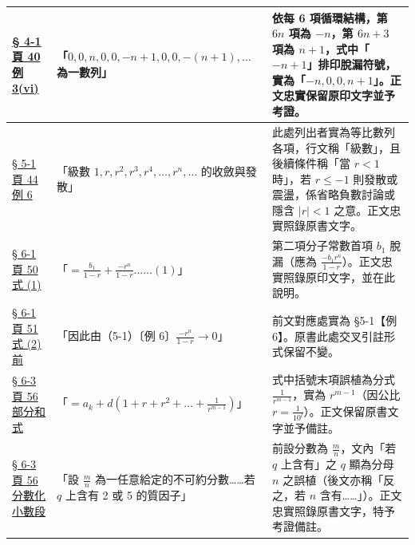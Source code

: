 \documentclass[a4paper,12pt,twoside]{article}
\begin{document}
\begin{table}[H]
\begin{tabularx}{\textwidth}{|p{3.0cm}|p{3.8cm}|X|}
\hyperref[note:b2-ch2-p40-ex3-vi]{§ 4-1 頁 40 例 3(vi)} & 
「$0, 0, n, 0, 0, -n+1, 0, 0, -(n+1), \dots$ 為一數列」 & 
依每 6 項循環結構，第 $6n$ 項為 $-n$，第 $6n+3$ 項為 $n+1$，式中「$-n+1$」排印脫漏符號，實為「$-n, 0, 0, n+1$」。正文忠實保留原印文字並予考證。 \\ \hline

\hyperref[note:b2-ch2-p44-ex6-series-term]{§ 5-1 頁 44 例 6} & 
「級數 $1, r, r^2, r^3, r^4, \dots, r^n, \dots$ 的收斂與發散」 & 
此處列出者實為等比數列各項，行文稱「級數」，且後續條件稱「當 $r<1$ 時」，若 $r\le -1$ 則發散或震盪，係省略負數討論或隱含 $|r|<1$ 之意。正文忠實照錄原書文字。 \\ \hline

\hyperref[note:b2-ch2-p50-eq1-b1]{§ 6-1 頁 50 式 (1)} & 
「$= \frac{b_1}{1-r} + \frac{-r^n}{1-r} \dots\dots(1)$」 & 
第二項分子常數首項 $b_1$ 脫漏（應為 $\frac{-b_1 r^n}{1-r}$）。正文忠實照錄原印文字，並在此說明。 \\ \hline

\hyperref[note:b2-ch2-p51-lim-rn]{§ 6-1 頁 51 式 (2) 前} & 
「因此由（5-1）〔例 6〕$\frac{-r^n}{1-r} \to 0$」 & 
前文對應處實為 §5-1【例 6】。原書此處交叉引註形式保留不變。 \\ \hline

\hyperref[note:b2-ch2-p56-partial-sum-r]{§ 6-3 頁 56 部分和式} & 
「$= a_k + d(1+r+r^2+\dots+\frac{1}{r^{m-1}})$」 & 
式中括號末項誤植為分式 $\frac{1}{r^{m-1}}$，實為 $r^{m-1}$（因公比 $r=\frac{1}{10^l}$）。正文保留原書文字並予備註。 \\ \hline

\hyperref[note:b2-ch2-p56-q-typo]{§ 6-3 頁 56 分數化小數段} & 
「設 $\frac{m}{n}$ 為一任意給定的不可約分數……若 $q$ 上含有 2 或 5 的質因子」 & 
前設分數為 $\frac{m}{n}$，文內「若 $q$ 上含有」之 $q$ 顯為分母 $n$ 之誤植（後文亦稱「反之，若 $n$ 含有……」）。正文忠實照錄原書文字，特予考證備註。 \\ \hline

\end{tabularx}
\end{table}
\end{document}
